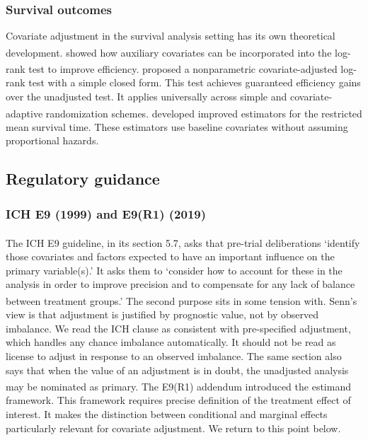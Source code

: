 \documentclass[
  11pt,
]{article}
\begin{document}
\subsubsection{Survival outcomes}\label{survival-outcomes}

Covariate adjustment in the survival analysis setting
has its own theoretical development.\textsuperscript{}
showed how auxiliary covariates can be incorporated
into the log-rank test to improve efficiency.\textsuperscript{} proposed a nonparametric
covariate-adjusted log-rank test with a simple closed
form. This test achieves guaranteed efficiency gains
over the unadjusted test. It applies universally across
simple and covariate-adaptive randomization schemes.\textsuperscript{} developed improved estimators for the
restricted mean survival time. These estimators use
baseline covariates without assuming proportional
hazards.

\subsection{Regulatory guidance}\label{regulatory-guidance}

\subsubsection{ICH E9 (1999) and E9(R1) (2019)}\label{ich-e9-1999-and-e9r1-2019}

The ICH E9 guideline\textsuperscript{}, in its
section 5.7, asks that pre-trial deliberations `identify
those covariates and factors expected to have an
important influence on the primary variable(s).' It
asks them to `consider how to account for these in the
analysis in order to improve precision and to
compensate for any lack of balance between treatment
groups.' The second purpose sits in some tension with\textsuperscript{}. Senn's view is that
adjustment is justified by prognostic value, not by
observed imbalance. We read the ICH clause as
consistent with pre-specified adjustment, which handles
any chance imbalance automatically. It should not be
read as license to adjust in response to an observed
imbalance. The same section also says that when the
value of an adjustment is in doubt, the unadjusted
analysis may be nominated as primary. The E9(R1)
addendum\textsuperscript{} introduced the
estimand framework. This framework requires precise
definition of the treatment effect of interest. It
makes the distinction between conditional and marginal
effects particularly relevant for covariate adjustment.
We return to this point below.
\end{document}
